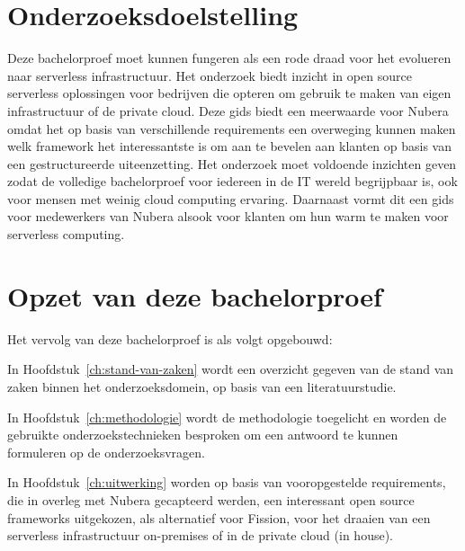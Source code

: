 \section{Onderzoeksdoelstelling}
\label{sec:onderzoeksdoelstelling}

Deze bachelorproef moet kunnen fungeren als een rode draad voor het evolueren naar serverless infrastructuur. Het onderzoek biedt inzicht in open source serverless oplossingen voor bedrijven die opteren om gebruik te maken van eigen infrastructuur of de private cloud. Deze gids biedt een meerwaarde voor Nubera omdat het op basis van verschillende requirements een overweging kunnen maken welk framework het interessantste is om aan te bevelen aan klanten op basis van een gestructureerde uiteenzetting. Het onderzoek moet voldoende inzichten geven zodat de volledige bachelorproef voor iedereen in de IT wereld begrijpbaar is, ook voor mensen met weinig cloud computing ervaring. Daarnaast vormt dit een gids voor medewerkers van Nubera alsook voor klanten om hun warm te maken voor serverless computing.


\section{Opzet van deze bachelorproef}
\label{sec:opzet-bachelorproef}


Het vervolg van deze bachelorproef is als volgt opgebouwd:

In Hoofdstuk~\ref{ch:stand-van-zaken} wordt een overzicht gegeven van de stand van zaken binnen het onderzoeksdomein, op basis van een literatuurstudie.

In Hoofdstuk~\ref{ch:methodologie} wordt de methodologie toegelicht en worden de gebruikte onderzoekstechnieken besproken om een antwoord te kunnen formuleren op de onderzoeksvragen.

In Hoofdstuk~\ref{ch:uitwerking} worden op basis van vooropgestelde requirements, die in overleg met Nubera gecapteerd werden, een interessant open source frameworks uitgekozen, als alternatief voor Fission, voor het draaien van een serverless infrastructuur on-premises of in de private cloud (in house).

